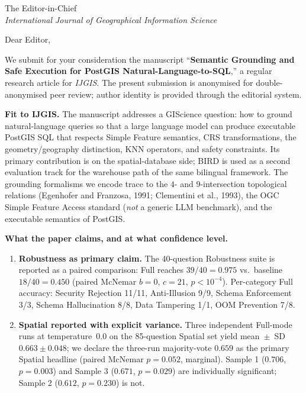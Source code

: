 \documentclass[11pt]{letter}
\begin{document}
\begin{letter}{The Editor-in-Chief \\ \emph{International Journal of Geographical Information Science}}

\opening{Dear Editor,}

We submit for your consideration the manuscript ``\textbf{Semantic Grounding and Safe Execution for PostGIS Natural-Language-to-SQL},'' a regular research article for \emph{IJGIS}. The present submission is anonymised for double-anonymised peer review; author identity is provided through the editorial system.

\medskip
\noindent\textbf{Fit to IJGIS.} The manuscript addresses a GIScience question: how to ground natural-language queries so that a large language model can produce executable PostGIS SQL that respects Simple Feature semantics, CRS transformations, the geometry/geography distinction, KNN operators, and safety constraints. Its primary contribution is on the spatial-database side; BIRD is used as a second evaluation track for the warehouse path of the same bilingual framework. The grounding formalisms we encode trace to the $4$- and $9$-intersection topological relations (Egenhofer and Franzosa, 1991; Clementini et al., 1993), the OGC Simple Feature Access standard (\emph{not} a generic LLM benchmark), and the executable semantics of PostGIS.

\medskip
\noindent\textbf{What the paper claims, and at what confidence level.}

\begin{enumerate}[leftmargin=*]
\item \textbf{Robustness as primary claim.} The 40-question Robustness suite is reported as a paired comparison: Full reaches $39/40 = 0.975$ vs.\ baseline $18/40 = 0.450$ (paired McNemar $b=0$, $c=21$, $p<10^{-4}$). Per-category Full accuracy: Security Rejection 11/11, Anti-Illusion 9/9, Schema Enforcement 3/3, Schema Hallucination 8/8, Data Tampering 1/1, OOM Prevention 7/8.

\item \textbf{Spatial reported with explicit variance.} Three independent Full-mode runs at temperature~$0.0$ on the 85-question Spatial set yield mean~$\pm$~SD $0.663 \pm 0.048$; we declare the three-run majority-vote $0.659$ as the primary Spatial headline (paired McNemar $p=0.052$, marginal). Sample 1 ($0.706$, $p=0.003$) and Sample 3 ($0.671$, $p=0.029$) are individually significant; Sample 2 ($0.612$, $p=0.230$) is not.


\end{enumerate}
\end{letter}
\end{document}

